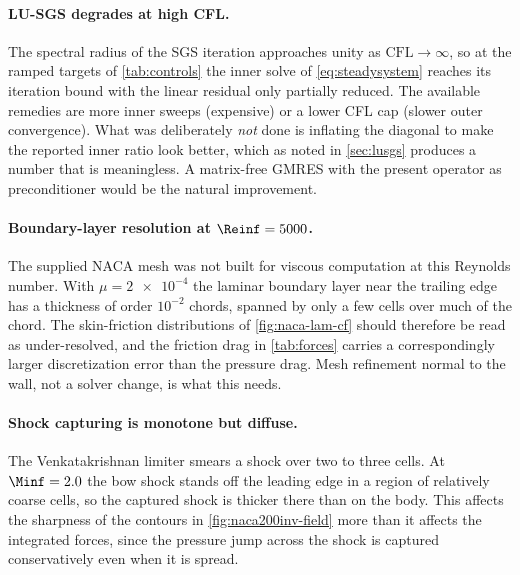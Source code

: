 \paragraph{LU-SGS degrades at high CFL.} The spectral radius of the SGS iteration
approaches unity as $\mathrm{CFL}\to\infty$, so at the ramped targets of
\cref{tab:controls} the inner solve of \cref{eq:steadysystem} reaches its
iteration bound with the linear residual only partially reduced. The available
remedies are more inner sweeps (expensive) or a lower CFL cap (slower outer
convergence). What was deliberately \emph{not} done is inflating the diagonal to
make the reported inner ratio look better, which as noted in \cref{sec:lusgs}
produces a number that is meaningless. A matrix-free GMRES with the present
operator as preconditioner would be the natural improvement.

\paragraph{Boundary-layer resolution at $\Reinf=5000$.} The supplied NACA mesh was
not built for viscous computation at this Reynolds number. With
$\mu=\num{2e-4}$ the laminar boundary layer near the trailing edge has a thickness
of order $10^{-2}$ chords, spanned by only a few cells over much of the chord. The
skin-friction distributions of \cref{fig:naca-lam-cf} should therefore be read as
under-resolved, and the friction drag in \cref{tab:forces} carries a
correspondingly larger discretization error than the pressure drag. Mesh
refinement normal to the wall, not a solver change, is what this needs.

\paragraph{Shock capturing is monotone but diffuse.} The Venkatakrishnan limiter
smears a shock over two to three cells. At $\Minf=2.0$ the bow shock stands off
the leading edge in a region of relatively coarse cells, so the captured shock is
thicker there than on the body. This affects the sharpness of the contours in
\cref{fig:naca200inv-field} more than it affects the integrated forces, since the
pressure jump across the shock is captured conservatively even when it is spread.

